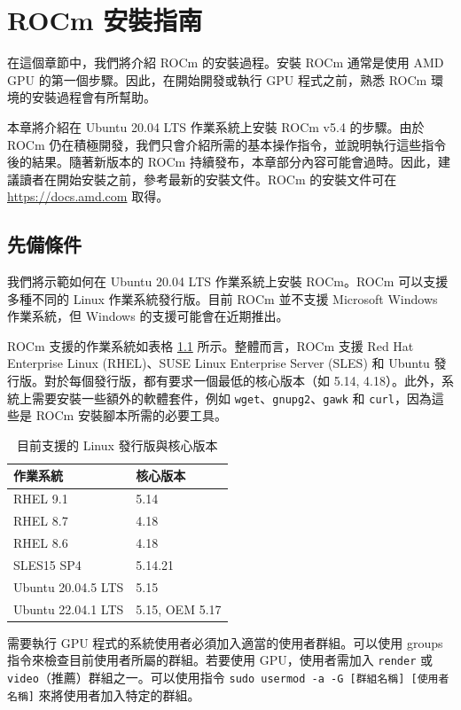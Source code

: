 \chapter{ROCm 安裝指南}\label{AppendiceA}

在這個章節中，我們將介紹 ROCm 的安裝過程。安裝 ROCm 通常是使用 AMD GPU 的第一個步驟。因此，在開始開發或執行 GPU 程式之前，熟悉 ROCm 環境的安裝過程會有所幫助。

本章將介紹在 Ubuntu 20.04 LTS 作業系統上安裝 ROCm v5.4 的步驟。由於 ROCm 仍在積極開發，我們只會介紹所需的基本操作指令，並說明執行這些指令後的結果。隨著新版本的 ROCm 持續發布，本章部分內容可能會過時。因此，建議讀者在開始安裝之前，參考最新的安裝文件。ROCm 的安裝文件可在 \url{https://docs.amd.com} 取得。

\section{先備條件}

我們將示範如何在 Ubuntu 20.04 LTS 作業系統上安裝 ROCm。ROCm 可以支援多種不同的 Linux 作業系統發行版。目前 ROCm 並不支援 Microsoft Windows 作業系統，但 Windows 的支援可能會在近期推出。

ROCm 支援的作業系統如表格 \ref{table:rocm_supported_distros_and_kernel_versions} 所示。整體而言，ROCm 支援 Red Hat Enterprise Linux (RHEL)、SUSE Linux Enterprise Server (SLES) 和 Ubuntu 發行版。對於每個發行版，都有要求一個最低的核心版本（如 5.14, 4.18）。此外，系統上需要安裝一些額外的軟體套件，例如 \lstinline|wget|、\lstinline|gnupg2|、\lstinline|gawk| 和 \lstinline|curl|，因為這些是 ROCm 安裝腳本所需的必要工具。


\begin{table}[h!]
\centering
\caption{目前支援的 Linux 發行版與核心版本}
\label{table:rocm_supported_distros_and_kernel_versions}
\begin{tabular}{ll}
\hline
\textbf{作業系統} & \textbf{核心版本} \\ \hline  
RHEL 9.1 & 5.14 \\ 
RHEL 8.7 & 4.18 \\ 
RHEL 8.6 & 4.18 \\ 
SLES15 SP4 & 5.14.21 \\ 
Ubuntu 20.04.5 LTS & 5.15 \\ 
Ubuntu 22.04.1 LTS & 5.15, OEM 5.17 \\ \hline 
\end{tabular}
\end{table}


需要執行 GPU 程式的系統使用者必須加入適當的使用者群組。可以使用 groups 指令來檢查目前使用者所屬的群組。若要使用 GPU，使用者需加入 \lstinline|render| 或 \lstinline|video|（推薦）群組之一。可以使用指令 \lstinline|sudo usermod -a -G [群組名稱] [使用者名稱]| 來將使用者加入特定的群組。

